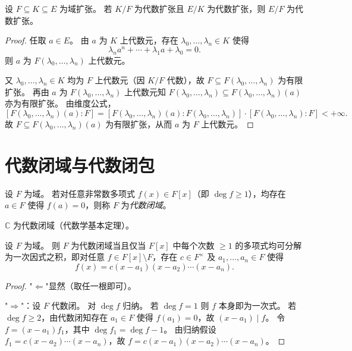 \documentclass[lang=cn,a4paper,newtx]{elegantbook}
\begin{document}
\begin{theorem}[代数扩张的传递性]
  设 $F\subseteq K\subseteq E$ 为域扩张。
  若 $K/F$ 为代数扩张且 $E/K$ 为代数扩张，则 $E/F$ 为代数扩张。
\end{theorem}

\begin{proof}
  任取 $a\in E$。
  由 $a$ 为 $K$ 上代数元，存在 $\lambda_0,\dots,\lambda_n\in K$ 使得
  \[
    \lambda_n a^n+\cdots+\lambda_1 a+\lambda_0=0.
  \]
  则 $a$ 为 $F(\lambda_0,\dots,\lambda_n)$ 上代数元。

  又 $\lambda_0,\dots,\lambda_n\in K$ 均为 $F$ 上代数元（因 $K/F$ 代数），故 $F\subseteq F(\lambda_0,\dots,\lambda_n)$ 为有限扩张。
  再由 $a$ 为 $F(\lambda_0,\dots,\lambda_n)$ 上代数元知 $F(\lambda_0,\dots,\lambda_n)\subseteq F(\lambda_0,\dots,\lambda_n)(a)$ 亦为有限扩张。
  由维度公式，
  \[
    [F(\lambda_0,\dots,\lambda_n)(a):F]=[F(\lambda_0,\dots,\lambda_n)(a):F(\lambda_0,\dots,\lambda_n)]\cdot[F(\lambda_0,\dots,\lambda_n):F]<+\infty.
  \]
  故 $F\subseteq F(\lambda_0,\dots,\lambda_n)(a)$ 为有限扩张，从而 $a$ 为 $F$ 上代数元。
\end{proof}

\section{代数闭域与代数闭包}

\begin{definition}[代数闭域]
  设 $F$ 为域。
  若对任意非常数多项式 $f(x)\in F[x]$（即 $\deg f\ge 1$），均存在 $a\in F$ 使得 $f(a)=0$，则称 $F$ 为\emph{代数闭域}。
\end{definition}

\begin{example}
  $\mathbb{C}$ 为代数闭域（代数学基本定理）。
\end{example}

\begin{proposition}
  设 $F$ 为域。
  则 $F$ 为代数闭域当且仅当 $F[x]$ 中每个次数 $\ge 1$ 的多项式均可分解为一次因式之积，即对任意 $f\in F[x]\setminus F$，存在 $c\in F^{\times}$ 及 $a_1,\dots,a_n\in F$ 使得
  \[
    f(x)=c(x-a_1)(x-a_2)\cdots(x-a_n).
  \]
\end{proposition}

\begin{proof}
  "$\Leftarrow$"显然（取任一根即可）。

  "$\Rightarrow$"：设 $F$ 代数闭。
  对 $\deg f$ 归纳。
  若 $\deg f=1$ 则 $f$ 本身即为一次式。
  若 $\deg f\ge 2$，由代数闭知存在 $a_1\in F$ 使得 $f(a_1)=0$，故 $(x-a_1)\mid f$。
  令 $f=(x-a_1)f_1$，其中 $\deg f_1=\deg f-1$。
  由归纳假设 $f_1=c(x-a_2)\cdots(x-a_n)$，故 $f=c(x-a_1)(x-a_2)\cdots(x-a_n)$。
\end{proof}
\end{document}
